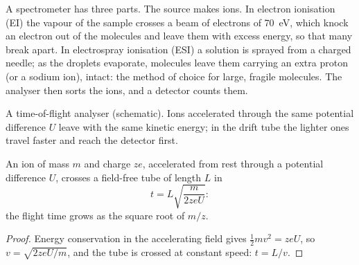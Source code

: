 A spectrometer has three parts. The source makes ions. In electron ionisation (EI) the vapour of the
sample crosses a beam of electrons of \qty{70}{eV}, which knock an electron out of the molecules and
leave them with excess energy, so that many break apart. In electrospray ionisation (ESI) a solution is
sprayed from a charged needle; as the droplets evaporate, molecules leave them carrying an extra proton
(or a sodium ion), intact: the method of choice for large, fragile molecules. The analyser then sorts
the ions, and a detector counts them.

\begin{omfigure}
\par\vspace{4pt}

{\small A time-of-flight analyser (schematic). Ions accelerated through the same potential difference
$U$ leave with the same kinetic energy; in the drift tube the lighter ones travel faster and reach the
detector first.}
\end{omfigure}

\begin{proposition}\label{prop:b2:mass-spec-atomic:time-of-flight}
An ion of mass $m$ and charge $ze$, accelerated from rest through a potential difference $U$, crosses a
field-free tube of length $L$ in
\begin{equation*}
t = L\sqrt{\frac{m}{2zeU}}:
\end{equation*}
the flight time grows as the square root of $m/z$.
\end{proposition}

\begin{proof}
Energy conservation in the accelerating field gives $\tfrac12mv^2 = zeU$, so $v = \sqrt{2zeU/m}$, and
the tube is crossed at constant speed: $t = L/v$.
\end{proof}

